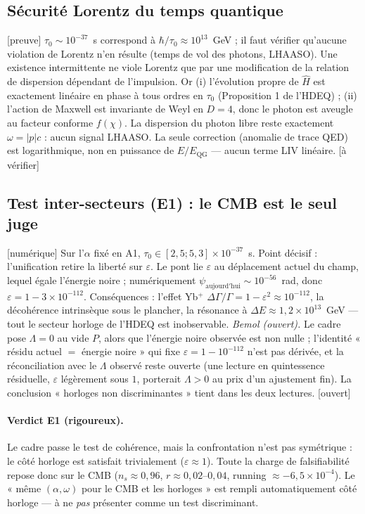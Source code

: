\documentclass[11pt,a4paper]{article}
\newcommand{\statut}[1]{{\footnotesize\textsf{[#1]}}}
\theoremstyle{definition}
\begin{document}
\subsection{S\'ecurit\'e Lorentz du temps quantique}
\statut{preuve} $\tau_0\sim10^{-37}$~s correspond \`a $\hbar/\tau_0\approx10^{13}$~GeV ; il faut
v\'erifier qu'aucune violation de Lorentz n'en r\'esulte (temps de vol des photons, LHAASO). Une
existence intermittente ne viole Lorentz que par une modification de la relation de dispersion
d\'ependant de l'impulsion. Or (i) l'\'evolution propre de $\hat H$ est exactement lin\'eaire en
phase \`a tous ordres en $\tau_0$ (Proposition 1 de l'HDEQ) ; (ii) l'action de Maxwell est
invariante de Weyl en $D=4$, donc le photon est aveugle au facteur conforme $f(\chi)$. La
dispersion du photon libre reste exactement $\omega=|p|c$ : aucun signal LHAASO. La seule
correction (anomalie de trace QED) est logarithmique, non en puissance de $E/E_{\mathrm{QG}}$
--- aucun terme LIV lin\'eaire. \statut{\`a v\'erifier}

\subsection{Test inter-secteurs (E1) : le CMB est le seul juge}
\statut{num\'erique} Sur l'$\alpha$ fix\'e en A1, $\tau_0\in[2{,}5;5{,}3]\times10^{-37}$~s. Point
d\'ecisif : l'unification retire la libert\'e sur $\varepsilon$. Le pont lie $\varepsilon$ au
d\'eplacement actuel du champ, lequel \'egale l'\'energie noire ; num\'eriquement
$\psi_{\mathrm{aujourd'hui}}\sim10^{-56}$~rad, donc $\varepsilon=1-3\times10^{-112}$.
Cons\'equences : l'effet Yb$^+$ $\Delta\Gamma/\Gamma=1-\varepsilon^2\approx10^{-112}$, la
d\'ecoh\'erence intrins\`eque sous le plancher, la r\'esonance \`a $\Delta E\approx1{,}2\times10^{13}$~GeV
--- tout le secteur horloge de l'HDEQ est inobservable. \emph{Bemol (ouvert).} Le cadre pose
$\Lambda=0$ au vide $P$, alors que l'\'energie noire observ\'ee est non nulle ; l'identit\'e
« r\'esidu actuel $=$ \'energie noire » qui fixe $\varepsilon=1-10^{-112}$ n'est pas d\'eriv\'ee,
et la r\'econciliation avec le $\Lambda$ observ\'e reste ouverte (une lecture en quintessence
r\'esiduelle, $\varepsilon$ l\'eg\`erement sous $1$, porterait $\Lambda>0$ au prix d'un
ajustement fin). La conclusion « horloges non discriminantes » tient dans les deux lectures.
\statut{ouvert}

\paragraph{Verdict E1 (rigoureux).} Le cadre passe le test de coh\'erence, mais la confrontation
n'est pas sym\'etrique : le c\^ot\'e horloge est satisfait trivialement ($\varepsilon\approx1$).
Toute la charge de falsifiabilit\'e repose donc sur le CMB ($n_s\approx0{,}96$,
$r\approx0{,}02$--$0{,}04$, running $\approx-6{,}5\times10^{-4}$). Le « m\^eme $(\alpha,\omega)$
pour le CMB et les horloges » est rempli automatiquement c\^ot\'e horloge --- \`a ne \emph{pas}
pr\'esenter comme un test discriminant.
\end{document}

